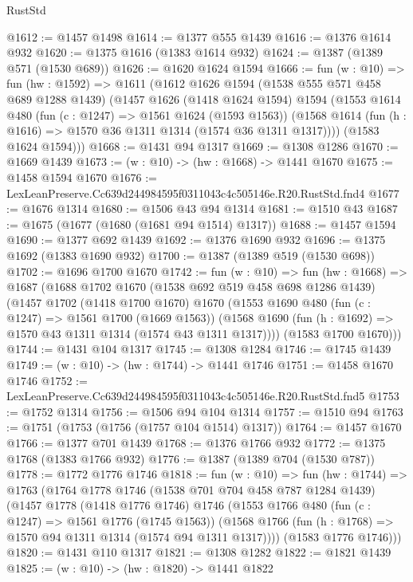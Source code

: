 \begin{lexlean}{RustStd}
\begin{coremodule}
@1612 := @1457 @1498
@1614 := @1377 @555 @1439
@1616 := @1376 @1614 @932
@1620 := @1375 @1616 (@1383 @1614 @932)
@1624 := @1387 (@1389 @571 (@1530 @689))
@1626 := @1620 @1624 @1594
@1666 := fun (w : @10) =>
  fun (hw : @1592) =>
  @1611
    (@1612
      @1626
      @1594
      (@1538 @555 @571 @458 @689 @1288 @1439)
      (@1457
        @1626
        (@1418 @1624 @1594)
        @1594
        (@1553
          @1614
          @480
          (fun (c : @1247) => @1561 @1624 (@1593 @1563))
          (@1568 @1614 (fun (h : @1616) => @1570 @36 @1311 @1314 (@1574 @36 @1311 @1317))))
        (@1583 @1624 @1594)))
@1668 := @1431 @94 @1317
@1669 := @1308 @1286
@1670 := @1669 @1439
@1673 := (w : @10) -> (hw : @1668) -> @1441 @1670
@1675 := @1458 @1594 @1670
@1676 := LexLeanPreserve.Cc639d244984595f0311043c4c505146e.R20.RustStd.fnd4
@1677 := @1676 @1314
@1680 := @1506 @43 @94 @1314
@1681 := @1510 @43
@1687 := @1675 (@1677 (@1680 (@1681 @94 @1514) @1317))
@1688 := @1457 @1594
@1690 := @1377 @692 @1439
@1692 := @1376 @1690 @932
@1696 := @1375 @1692 (@1383 @1690 @932)
@1700 := @1387 (@1389 @519 (@1530 @698))
@1702 := @1696 @1700 @1670
@1742 := fun (w : @10) =>
  fun (hw : @1668) =>
  @1687
    (@1688
      @1702
      @1670
      (@1538 @692 @519 @458 @698 @1286 @1439)
      (@1457
        @1702
        (@1418 @1700 @1670)
        @1670
        (@1553
          @1690
          @480
          (fun (c : @1247) => @1561 @1700 (@1669 @1563))
          (@1568 @1690 (fun (h : @1692) => @1570 @43 @1311 @1314 (@1574 @43 @1311 @1317))))
        (@1583 @1700 @1670)))
@1744 := @1431 @104 @1317
@1745 := @1308 @1284
@1746 := @1745 @1439
@1749 := (w : @10) -> (hw : @1744) -> @1441 @1746
@1751 := @1458 @1670 @1746
@1752 := LexLeanPreserve.Cc639d244984595f0311043c4c505146e.R20.RustStd.fnd5
@1753 := @1752 @1314
@1756 := @1506 @94 @104 @1314
@1757 := @1510 @94
@1763 := @1751 (@1753 (@1756 (@1757 @104 @1514) @1317))
@1764 := @1457 @1670
@1766 := @1377 @701 @1439
@1768 := @1376 @1766 @932
@1772 := @1375 @1768 (@1383 @1766 @932)
@1776 := @1387 (@1389 @704 (@1530 @787))
@1778 := @1772 @1776 @1746
@1818 := fun (w : @10) =>
  fun (hw : @1744) =>
  @1763
    (@1764
      @1778
      @1746
      (@1538 @701 @704 @458 @787 @1284 @1439)
      (@1457
        @1778
        (@1418 @1776 @1746)
        @1746
        (@1553
          @1766
          @480
          (fun (c : @1247) => @1561 @1776 (@1745 @1563))
          (@1568 @1766 (fun (h : @1768) => @1570 @94 @1311 @1314 (@1574 @94 @1311 @1317))))
        (@1583 @1776 @1746)))
@1820 := @1431 @110 @1317
@1821 := @1308 @1282
@1822 := @1821 @1439
@1825 := (w : @10) -> (hw : @1820) -> @1441 @1822

\end{coremodule}
\end{lexlean}
